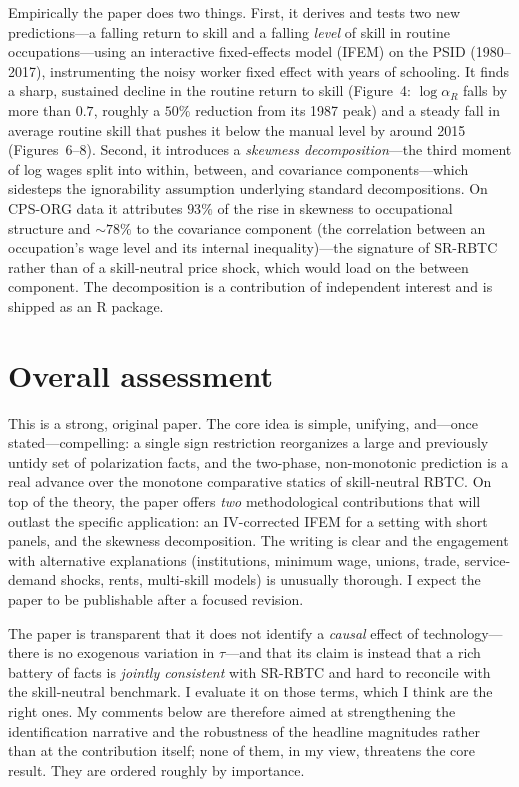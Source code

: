 \documentclass[11pt]{article}
\begin{document}
Empirically the paper does two things. First, it derives and tests two new predictions---a falling
return to skill and a falling \emph{level} of skill in routine occupations---using an interactive
fixed-effects model (IFEM) on the PSID (1980--2017), instrumenting the noisy worker fixed effect
with years of schooling. It finds a sharp, sustained decline in the routine return to skill
(Figure~4: $\log\alpha_R$ falls by more than $0.7$, roughly a $50\%$ reduction from its 1987 peak)
and a steady fall in average routine skill that pushes it below the manual level by around 2015
(Figures~6--8). Second, it introduces a \emph{skewness decomposition}---the third moment of log wages
split into within, between, and covariance components---which sidesteps the ignorability assumption
underlying standard decompositions. On CPS-ORG data it attributes $93\%$ of the rise in skewness to
occupational structure and $\sim\!78\%$ to the covariance component (the correlation between an
occupation's wage level and its internal inequality)---the signature of SR-RBTC rather than of a
skill-neutral price shock, which would load on the between component. The decomposition is a
contribution of independent interest and is shipped as an R package.

\section*{Overall assessment}

This is a strong, original paper. The core idea is simple, unifying, and---once stated---compelling:
a single sign restriction reorganizes a large and previously untidy set of polarization facts, and
the two-phase, non-monotonic prediction is a real advance over the monotone comparative statics of
skill-neutral RBTC. On top of the theory, the paper offers \emph{two} methodological contributions
that will outlast the specific application: an IV-corrected IFEM for a setting with short panels, and
the skewness decomposition. The writing is clear and the engagement with alternative explanations
(institutions, minimum wage, unions, trade, service-demand shocks, rents, multi-skill models) is
unusually thorough. I expect the paper to be publishable after a focused revision.

The paper is transparent that it does not identify a \emph{causal} effect of technology---there is
no exogenous variation in $\tau$---and that its claim is instead that a rich battery of facts is
\emph{jointly consistent} with SR-RBTC and hard to reconcile with the skill-neutral benchmark. I
evaluate it on those terms, which I think are the right ones. My comments below are therefore aimed
at strengthening the identification narrative and the robustness of the headline magnitudes rather
than at the contribution itself; none of them, in my view, threatens the core result. They are
ordered roughly by importance.
\end{document}
